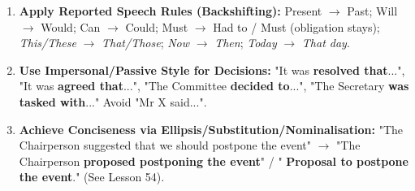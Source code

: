 \documentclass[11pt]{article}
\newcommand{\cle}[1]{{\popxbold\color{popdark}#1}}
\begin{document}
\begin{methode}
\begin{enumerate}
\begin{enumerate}
    \end{enumerate}
    \item \textbf{Apply \cle{Reported Speech} Rules (Backshifting):} Present $\rightarrow$ Past; Will $\rightarrow$ Would; Can $\rightarrow$ Could; Must $\rightarrow$ Had to / Must (obligation stays); \textit{This/These} $\rightarrow$ \textit{That/Those}; \textit{Now} $\rightarrow$ \textit{Then}; \textit{Today} $\rightarrow$ \textit{That day}.
    \item \textbf{Use \cle{Impersonal/Passive Style} for Decisions:} "It was \textbf{resolved that}...", "It was \textbf{agreed that}...", "The Committee \textbf{decided to}...", "The Secretary \textbf{was tasked with}..." Avoid "Mr X said...".
    \item \textbf{Achieve \cle{Conciseness} via Ellipsis/Substitution/Nominalisation:} "The Chairperson suggested that we should postpone the event" $\rightarrow$ "The Chairperson \textbf{proposed postponing the event}" / " \textbf{Proposal to postpone the event}." (See Lesson 54).
\end{enumerate}
\end{methode}
\end{document}
